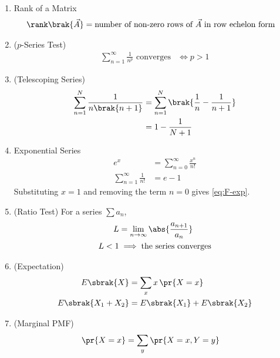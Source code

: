 \begin{enumerate}[label=\thesubsection.\arabic*, ref=\thesubsection.\theenumi, itemsep=0pt, leftmargin=0pt, labelwidth=0pt, itemindent=0pt, labelsep=1em, align=right]

\item Rank of a Matrix
\begin{align}
\rank\brak{\vec{A}} &= \text{number of non-zero rows of } \vec{A} \text{ in row echelon form}
\label{eq:F-rank-pivots}
\end{align}

\item ($p$-Series Test)
\begin{align}
\sum_{n=1}^{\infty} \frac{1}{n^{p}} \text{ converges} &\iff p > 1
\label{eq:F-pseries}
\end{align}

\item (Telescoping Series)
\begin{align}
\sum_{n=1}^{N} \frac{1}{n\brak{n+1}} &= \sum_{n=1}^{N} \brak{\frac{1}{n} - \frac{1}{n+1}}
\\
&= 1 - \frac{1}{N+1}
\label{eq:F-telescope}
\end{align}

\item Exponential Series
\begin{align}
e^x &= \sum_{n=0}^{\infty} \frac{x^n}{n!}
\\
\sum_{n=1}^{\infty} \frac{1}{n!} &= e - 1
\label{eq:F-exp}
\end{align}
\solution Substituting $x = 1$ and removing the term $n = 0$ gives \eqref{eq:F-exp}.

\item (Ratio Test) For a series $\sum a_n$,
\begin{align}
L &= \lim_{n \to \infty} \abs{\frac{a_{n+1}}{a_n}}
\\
L < 1 &\implies \text{the series converges}
\label{eq:F-ratio}
\end{align}

\item (Expectation)
\begin{align}
E\sbrak{X} &= \sum_{x} x \, \pr{X = x}
\\
E\sbrak{X_1 + X_2} &= E\sbrak{X_1} + E\sbrak{X_2}
\label{eq:F-expect}
\end{align}

\item (Marginal PMF)
\begin{align}
\pr{X = x} &= \sum_{y} \pr{X = x, Y = y}
\label{eq:F-marginal}
\end{align}


\end{enumerate}
